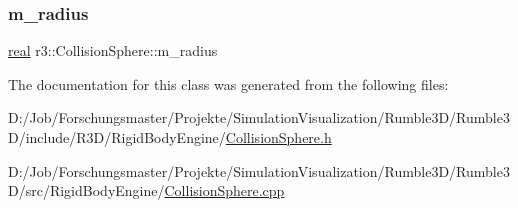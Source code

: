 \subsubsection{\texorpdfstring{m\+\_\+radius}{m\_radius}}
{\footnotesize\ttfamily \mbox{\hyperlink{namespacer3_ab2016b3e3f743fb735afce242f0dc1eb}{real}} r3\+::\+Collision\+Sphere\+::m\+\_\+radius\hspace{0.3cm}{\ttfamily [protected]}}



The documentation for this class was generated from the following files\+:\begin{DoxyCompactItemize}
\item 
D\+:/\+Job/\+Forschungsmaster/\+Projekte/\+Simulation\+Visualization/\+Rumble3\+D/\+Rumble3\+D/include/\+R3\+D/\+Rigid\+Body\+Engine/\mbox{\hyperlink{_collision_sphere_8h}{Collision\+Sphere.\+h}}\item 
D\+:/\+Job/\+Forschungsmaster/\+Projekte/\+Simulation\+Visualization/\+Rumble3\+D/\+Rumble3\+D/src/\+Rigid\+Body\+Engine/\mbox{\hyperlink{_collision_sphere_8cpp}{Collision\+Sphere.\+cpp}}\end{DoxyCompactItemize}

